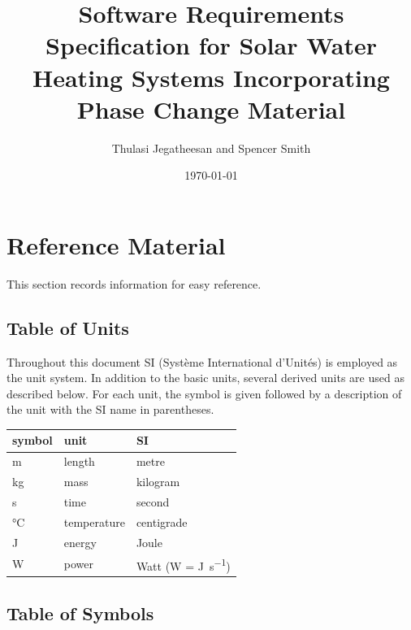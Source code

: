 \documentclass[12pt]{article}
\begin{document}
\title{Software Requirements Specification for Solar Water Heating Systems
  Incorporating Phase Change Material} 
\author{Thulasi Jegatheesan and Spencer Smith}
\date{\today}
	
\maketitle

\tableofcontents

\section{Reference Material}

This section records information for easy reference.

\subsection{Table of Units}

Throughout this document SI (Syst\`{e}me International d'Unit\'{e}s) is employed
as the unit system.  In addition to the basic units, several derived units are
used as described below.  For each unit, the symbol is given followed by a
description of the unit with the SI name in parentheses.
~\newline

\renewcommand{\arraystretch}{1.2}
  \noindent \begin{tabular}{l l l} 
    \toprule		
    \textbf{symbol} & \textbf{unit} & \textbf{SI}\\
    \midrule 
    \si{\meter} & length & metre\\
    \si{\kilogram} & mass	& kilogram\\
    \si{\second} & time & second\\
    \si{\celsius} & temperature & centigrade\\
    \si{\joule} & energy & Joule\\
    \si{\watt} & power & Watt (W = \si{\joule\per\second})\\
    \bottomrule
  \end{tabular}

\subsection{Table of Symbols}
\end{document}
